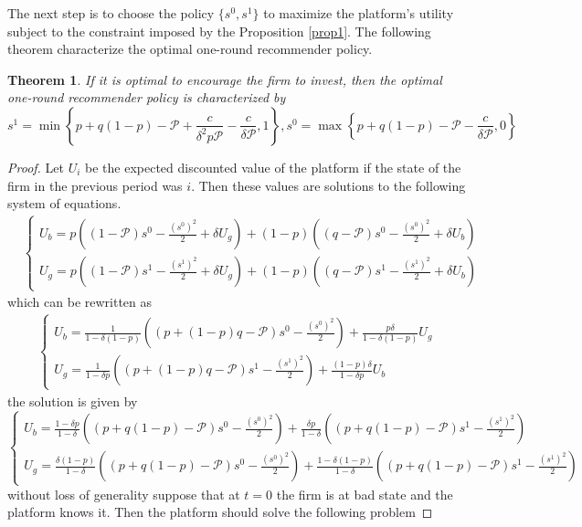\documentclass[a4paper]{article}
\newtheorem{theorem}{Theorem}
\begin{document}
The next step is to choose the policy $\{s^0, s^1\}$ to maximize the platform's utility subject to the constraint imposed by the Proposition \ref{prop1}. The following theorem characterize the optimal one-round recommender policy.
\begin{theorem}
	If it is optimal to encourage the firm to invest, then the optimal one-round recommender policy is characterized by $$s^1 = \min \left\{ p + q(1-p) - \mathcal{P} + \frac{c}{\delta^2 p \mathcal{P}} - \frac{c}{\delta \mathcal{P}}, 1\right\}, s^0 = \max\left\{ p + q(1-p) - \mathcal{P} - \frac{c}{\delta \mathcal{P}}, 0\right\}$$
\end{theorem} 
\begin{proof}
	Let $U_i$ be the expected discounted value of the platform if the state of the firm in the previous period was $i$. Then these values are solutions to the following system of equations. 
	\begin{align*}
	&\begin{cases}
	U_b = p\left((1-\mathcal{P})s^0 - \frac{(s^0)^2}{2} + \delta U_g\right) + (1-p)\left((q - \mathcal{P})s^0 - \frac{(s^0)^2}{2} + \delta U_b \right)\\
	U_g = p\left((1- \mathcal{P})s^1 - \frac{(s^1)^2}{2} + \delta U_g\right) + (1-p)\left((q - \mathcal{P})s^1 - \frac{(s^1)^2}{2} + \delta U_b \right)
	\end{cases} 
	\end{align*}
	which can be rewritten as
	\begin{align*}
	\begin{cases}
	U_b = \frac{1}{1 - \delta(1-p)} \left( (p + (1-p)q - \mathcal{P})s^0 - \frac{(s^0)^2}{2} \right) + \frac{p\delta}{1 - \delta(1-p)}U_g\\
	U_g = \frac{1}{1 - \delta p} \left( (p + (1-p)q - \mathcal{P})s^1 - \frac{(s^1)^2}{2} \right) + \frac{(1-p)\delta}{1 - \delta p}U_b
	\end{cases}
	\end{align*}
	the solution is given by
	$$\begin{cases}
	U_b = \frac{1-\delta p}{1-\delta}\left((p + q(1-p) - \mathcal{P})s^0 - \frac{(s^0)^2}{2}\right) + \frac{\delta p}{1-\delta}\left((p + q(1-p) - \mathcal{P})s^1 - \frac{(s^1)^2}{2}\right)\\
	U_g = \frac{\delta (1-p)}{1-\delta}\left((p + q(1-p) - \mathcal{P})s^0 - \frac{(s^0)^2}{2}\right) +\frac{1-\delta(1- p)}{1-\delta}\left((p + q(1-p) - \mathcal{P})s^1 - \frac{(s^1)^2}{2}\right)
	\end{cases}$$
	without loss of generality suppose that at $t = 0$ the firm is at bad state and the platform knows it. Then the platform should solve the following problem

\end{proof}
\end{document}
